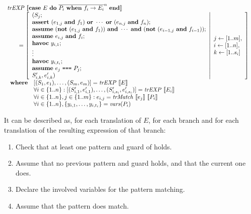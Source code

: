 \[
\begin{array}{l}
\mathit{trEXP}~\llbracket\textbf{case}~E~\textbf{do}~\overline{P_i~\textbf{when}~f_i \rightarrow E_i}^n~\textbf{end}\rrbracket\\
\qquad = \left[ \begin{array}{l}
(S_j;\\
\textbf{assert}~(e_{1,j}~\textbf{and}~f_1)~\textbf{or}~\cdots~\textbf{or}~(e_{n,j}~\textbf{and}~f_n); \\
\textbf{assume}~(\textbf{not}~(e_{1,j}~\textbf{and}~f_1))~\textbf{and}~\cdots~\textbf{and}~(\textbf{not}~(e_{i-1,j}~\textbf{and}~f_{i-1})); \\
\textbf{assume}~e_{i,j}~\textbf{and}~f_{i};\\
\textbf{havoc}~y_{i,1};\\
\vdots\\
\textbf{havoc}~y_{i,t_i};\\
\textbf{assume}~e_j~\texttt{===}~P_j; \\
S_{i,k}', e_{i,k}')
\end{array}  \middle\vert
\begin{array}{l}
j \leftarrow [1..m], \\
i \leftarrow [1..n], \\
k \leftarrow [1..s_i] \\
\end{array}
\right]\\
\begin{array}{ll}
\textbf{where} & [(S_1,e_1),\ldots,(S_m,e_m)] = \mathit{trEXP}~\llbracket E\rrbracket \\
& \forall i \in \{1..n\}: [(S'_{i,1},e'_{i,1}),\ldots,(S'_{i,s_i},e'_{i,s_i})] = \mathit{trEXP}~\llbracket E_i\rrbracket \\
& \forall i \in \{1..n\}, j \in \{1..m\}: e_{i,j} = \mathit{trMatch}~\llbracket e_j\rrbracket~\llbracket P_i\rrbracket \\
& \forall i \in \{1..n\}, \{y_{i,1}, \ldots, y_{i,t_i}\} = \mathit{vars}(P_i) \\
\end{array}
\end{array}
\]

It can be described as, for each translation of $E$, for each branch and for 
each translation of the resulting expression of that branch:

\begin{enumerate}
  \item Check that at least one pattern and guard of holds.
  \item Assume that no previous pattern and guard holds, and that the current one does.
  \item Declare the involved variables for the pattern matching.
  \item Assume that the pattern does match.
\end{enumerate}

